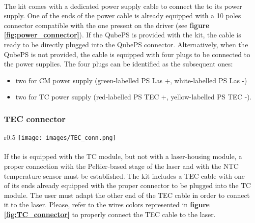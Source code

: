 \paragraph{}The \QubeModel  kit comes with a dedicated power supply cable to connect the \QubeModel  to its power supply.
\newline One of the ends of the \QubeModel  power cable is already equipped with a 10 poles connector compatible with the one present on the \QubeModel  driver (see \textbf{figure \ref{fig:power_connector}}). 
\newline If the QubePS is provided with the kit, the cable is ready to be directly plugged into the QubePS connector. Alternatively, when the QubePS is not provided, the cable is equipped with four plugs to be connected to the power supplies.
\newline The four plugs can be identified as the subsequent ones:
\begin{itemize}
    \item two for CM power supply (green-labelled PS Las +, white-labelled PS Las -) 
    \item two for TC power supply (red-labelled PS TEC +, yellow-labelled PS TEC -).
\end{itemize}





\subsubsection{TEC connector}  \label{cpt:tec_connector}
\begin{wrapfigure}{r}{0.5\textwidth}
    \texttt{[image: images/TEC\_conn.png]}
    \caption{TEC connector pin diagram}
    \label{fig:TC_connector}
\end{wrapfigure}

\paragraph{}If the \QubeModel  is equipped with the TC module, but not with a laser-housing module, a proper connection with the Peltier-based stage of the laser and with the NTC temperature sensor must be established.
\newline The \QubeModel  kit includes a TEC cable with one of its ends already equipped with the proper connector to be plugged into the TC module.
\newline The user must adapt the other end of the TEC cable in order to connect it to the laser. Please, refer to the wires colors represented in \textbf{figure \ref{fig:TC_connector}} to properly connect the TEC cable to the laser.




